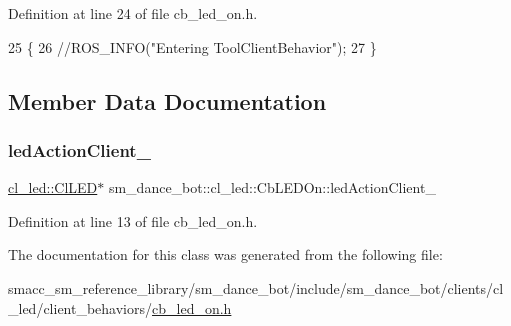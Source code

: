 Definition at line 24 of file cb\+\_\+led\+\_\+on.\+h.


\begin{DoxyCode}
25   \{
26     \textcolor{comment}{//ROS\_INFO("Entering ToolClientBehavior");}
27   \}
\end{DoxyCode}


\subsection{Member Data Documentation}
\mbox{\label{classsm__dance__bot_1_1cl__led_1_1CbLEDOn_a1ee516ed1a051922f804818ea429f2fe}} 
\subsubsection{\texorpdfstring{led\+Action\+Client\+\_\+}{ledActionClient\_}}
{\footnotesize\ttfamily \hyperlink{classsm__dance__bot_1_1cl__led_1_1ClLED}{cl\+\_\+led\+::\+Cl\+L\+ED}$\ast$ sm\+\_\+dance\+\_\+bot\+::cl\+\_\+led\+::\+Cb\+L\+E\+D\+On\+::led\+Action\+Client\+\_\+}



Definition at line 13 of file cb\+\_\+led\+\_\+on.\+h.



The documentation for this class was generated from the following file\+:\begin{DoxyCompactItemize}
\item 
smacc\+\_\+sm\+\_\+reference\+\_\+library/sm\+\_\+dance\+\_\+bot/include/sm\+\_\+dance\+\_\+bot/clients/cl\+\_\+led/client\+\_\+behaviors/\hyperlink{sm__dance__bot_2include_2sm__dance__bot_2clients_2cl__led_2client__behaviors_2cb__led__on_8h}{cb\+\_\+led\+\_\+on.\+h}\end{DoxyCompactItemize}
